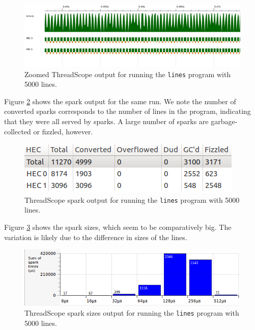 \documentclass[12pt, a4paper]{article}
\begin{document}
 \begin{figure}[H]
  \centering
  \includegraphics[width=\linewidth]{../threadscope/fillorder/lines-zoom}
  \caption{Zoomed ThreadScope output for running the \texttt{lines} program with 5000 lines.}
  \label{fig:lines-fillorder-zoom}
\end{figure}

Figure \ref{fig:lines-fillorder-spark} shows the spark output for the same run. We note the number of converted sparks corresponds to the number of lines in the program, indicating that they were all served by sparks. A large number of sparks are garbage-collected or fizzled, however.

 \begin{figure}[H]
  \centering
  \includegraphics[scale=1]{../threadscope/fillorder/lines-spark}
  \caption{ThreadScope spark output for running the \texttt{lines} program with 5000 lines.}
  \label{fig:lines-fillorder-spark}
\end{figure}

Figure \ref{fig:lines-fillorder-sizes} shows the spark sizes, which seem to be comparatively big. The variation is likely due to the difference in sizes of the lines.

 \begin{figure}[H]
  \centering
  \includegraphics[scale=0.7]{../threadscope/fillorder/lines-spark-sizes}
  \caption{ThreadScope spark sizes output for running the \texttt{lines} program with 5000 lines.}
  \label{fig:lines-fillorder-sizes}
\end{figure}
\end{document}
